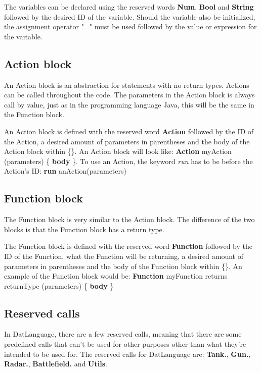 \begin{defi}
The variables can be declared using the reserved words \textbf{Num}, \textbf{Bool} and \textbf{String} followed by the desired ID of the variable. Should the variable also be initialized, the assignment operator "=" must be used followed by the value or expression for the variable. 
\end{defi}

\subsection{Action block}
An Action block is an abstraction for statements with no return types. Actions can be called throughout the code. The parameters in the Action block is always call by value, just as in the programming language Java, this will be the same in the Function block.

\begin{defi}
An Action block is defined with the reserved word \textbf{Action} followed by the ID of the Action, a desired amount of parameters in parentheses and the body of the Action block within \{\}. \newline
An Action block will look like: \textbf{Action} myAction (parameters) \{ \textbf{body} \}. \newline
To use an Action, the keyword \textit{run} has to be before the Action’s ID: \newline \textbf{run} anAction(parameters)
\end{defi}

\subsection{Function block}
The Function block is very similar to the Action block. The difference of the two blocks is that the Function block has a return type. 

\begin{defi}
The Function block is defined with the reserved word \textbf{Function} followed by the ID of the Function, what the Function will be returning, a desired amount of parameters in parentheses and the body of the Function block within \{\}. \newline
An example of the Function block would be: \textbf{Function} myFunction returns returnType (parameters) \{ \textbf{body} \}
\end{defi}

\subsection{Reserved calls}
In DatLanguage, there are a few reserved calls, meaning that there are some predefined calls that can’t be used for other purposes other than what they’re intended to be used for. The reserved calls for DatLanguage are: \textbf{Tank.}, \textbf{Gun.}, \textbf{Radar.}, \textbf{Battlefield.} and \textbf{Utils}. 

